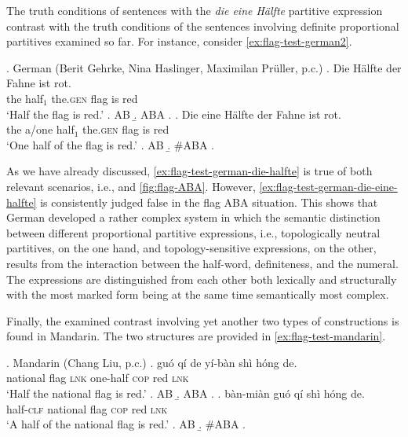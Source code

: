 The truth conditions of sentences with the \textit{die eine Hälfte} partitive expression contrast with the truth conditions of the sentences involving definite proportional partitives examined so far. For instance, consider \ref{ex:flag-test-german2}.  

\ex. German (Berit Gehrke, Nina Haslinger, Maximilan Prüller, p.c.)\label{ex:flag-test-german2}
\ag. Die Hälfte der Fahne ist rot.\label{ex:flag-test-german-die-halfte}\\
		the half$_1$ the.\textsc{gen} flag is red\\
		`Half the flag is red.'
		\a. AB
		\b. ABA
		\z.
		\bg. Die eine Hälfte der Fahne ist rot.\label{ex:flag-test-german-die-eine-halfte}\\
		the a/one half$_1$ the\textsc{.gen} flag is red\\
		`One half of the flag is red.'
		\a. AB
		\b. \#ABA
		\z.

As we have already discussed, \ref{ex:flag-test-german-die-halfte} is true of both relevant scenarios, i.e.,   and \ref{fig:flag-ABA}. However, \ref{ex:flag-test-german-die-eine-halfte} is consistently judged false in the flag ABA situation. This shows that German developed a rather complex system in which the semantic distinction between different proportional partitive expressions, i.e., topologically neutral partitives, on the one hand, and topology-sensitive expressions, on the other, results from the interaction between the half-word, definiteness, and the numeral. The expressions are distinguished from each other both lexically and structurally with the most marked form being at the same time  semantically most complex.

Finally, the examined contrast involving yet another two types of constructions is found in Mandarin. The two structures are provided in \ref{ex:flag-test-mandarin}. 

		\ex. Mandarin (Chang Liu, p.c.)\label{ex:flag-test-mandarin}
        \ag. gu{\'{o}} q{\'{i}} de y{\'{i}}-b{\`{a}}n sh{\`{i}} h{\'{o}}ng de.\label{ex:flag-test-mandarin-yiban}\\
		national flag \textsc{lnk} one-half \textsc{cop} red \textsc{lnk}\\
		`Half the national flag is red.'
		\a. AB
		\b. ABA
		\z.
		\pagebreak\bg. b{\`{a}}n-mi{\`{a}}n gu{\'{o}} q{\'{i}} sh{\`{i}} h{\'{o}}ng de.\label{ex:flag-test-mandarin-banmian}\\
		half-\textsc{clf} national flag \textsc{cop} red \textsc{lnk}\\
		`A half of the national flag is red.'
		\a. AB
		\b. \#ABA
		\z.


